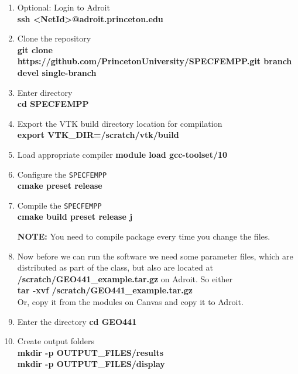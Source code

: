 \documentclass[11pt,titlepage,fleqn]{article}
\begin{document}
\begin{enumerate}

\item Optional: Login to Adroit\\
{\bf ssh <NetId>@adroit.princeton.edu}       
    
\item Clone the repository\\
      {\bf git clone https://github.com/PrincetonUniversity/SPECFEMPP.git \newline \text{-}\text{-}branch devel \text{-}\text{-}single-branch}
\item Enter directory\\
      {\bf cd SPECFEMPP}       
		
\item Export the VTK build directory location for compilation\\
      {\bf export VTK\_DIR=/scratch/vtk/build}

\item Load appropriate compiler
      {\bf module load gcc-toolset/10}

\item Configure the \texttt{SPECFEMPP}\\
      {\bf cmake \text{-}\text{-}preset release}

\item Compile the \texttt{SPECFEMPP}\\
      {\bf cmake \text{-}\text{-}build \text{-}\text{-}preset release \text{-}j}

      {\bf NOTE:} You need to compile package every time you change the files.

\item Now before we can run the software we need some parameter files, which are distributed as part of the class, but also are located at {\bf /scratch/GEO441\_example.tar.gz} on Adroit. So either \\
      {\bf tar -xvf /scratch/GEO441\_example.tar.gz}\\
    Or, copy it from the modules on Canvas and copy it to Adroit.
      
\item Enter the directory
      {\bf cd GEO441}

\item Create output folders\\
      {\bf mkdir -p OUTPUT\_FILES/results}\\
      {\bf mkdir -p OUTPUT\_FILES/display}
      

\end{enumerate}
\end{document}
